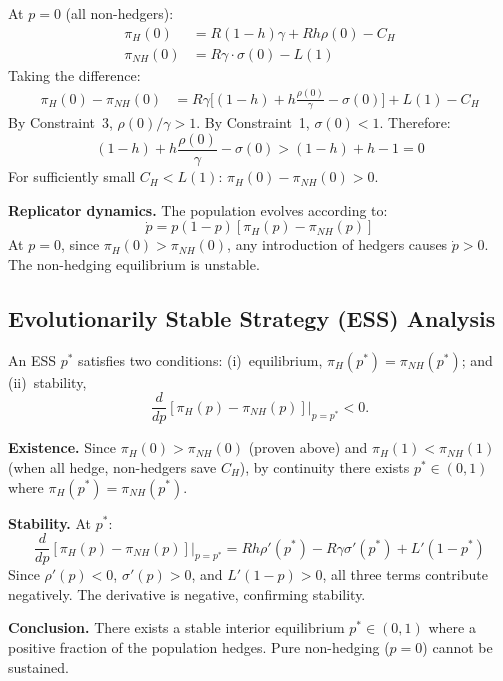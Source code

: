 \documentclass[11pt]{article}
\begin{document}
At $p=0$ (all non-hedgers):
\begin{align}
\pi_H(0) &= R(1-h)\gamma + Rh\rho(0) - C_H\\
\pi_{NH}(0) &= R\gamma \cdot \sigma(0) - L(1)
\end{align}
Taking the difference:
\begin{align}
\pi_H(0) - \pi_{NH}(0) &= R\gamma\bigl[(1-h) + h\tfrac{\rho(0)}{\gamma} - \sigma(0)\bigr] + L(1) - C_H
\end{align}
By Constraint~3, $\rho(0)/\gamma > 1$. By Constraint~1, $\sigma(0) < 1$. Therefore:
\begin{equation}
(1-h) + h\frac{\rho(0)}{\gamma} - \sigma(0) > (1-h) + h - 1 = 0
\end{equation}
For sufficiently small $C_H < L(1)$: $\pi_H(0) - \pi_{NH}(0) > 0$.

\textbf{Replicator dynamics.} The population evolves according to:
\begin{equation}
\dot{p} = p(1-p)[\pi_H(p) - \pi_{NH}(p)]
\end{equation}
At $p=0$, since $\pi_H(0) > \pi_{NH}(0)$, any introduction of hedgers causes $\dot{p} > 0$. The non-hedging equilibrium is unstable.

\subsection{Evolutionarily Stable Strategy (ESS) Analysis}
\label{sec:S3.4}

An ESS $p^*$ satisfies two conditions: (i)~equilibrium, $\pi_H(p^*) = \pi_{NH}(p^*)$; and (ii)~stability,
\[\frac{d}{dp}[\pi_H(p) - \pi_{NH}(p)]\big|_{p=p^*} < 0.\]

\textbf{Existence.} Since $\pi_H(0) > \pi_{NH}(0)$ (proven above) and $\pi_H(1) < \pi_{NH}(1)$ (when all hedge, non-hedgers save $C_H$), by continuity there exists $p^* \in (0,1)$ where $\pi_H(p^*) = \pi_{NH}(p^*)$.

\textbf{Stability.} At $p^*$:
\begin{equation}
\frac{d}{dp}[\pi_H(p) - \pi_{NH}(p)]\bigg|_{p=p^*} = Rh\rho'(p^*) - R\gamma\sigma'(p^*) + L'(1-p^*)
\end{equation}
Since $\rho'(p) < 0$, $\sigma'(p) > 0$, and $L'(1-p) > 0$, all three terms contribute negatively. The derivative is negative, confirming stability.

\textbf{Conclusion.} There exists a stable interior equilibrium $p^* \in (0, 1)$ where a positive fraction of the population hedges. Pure non-hedging ($p=0$) cannot be sustained.
\end{document}
